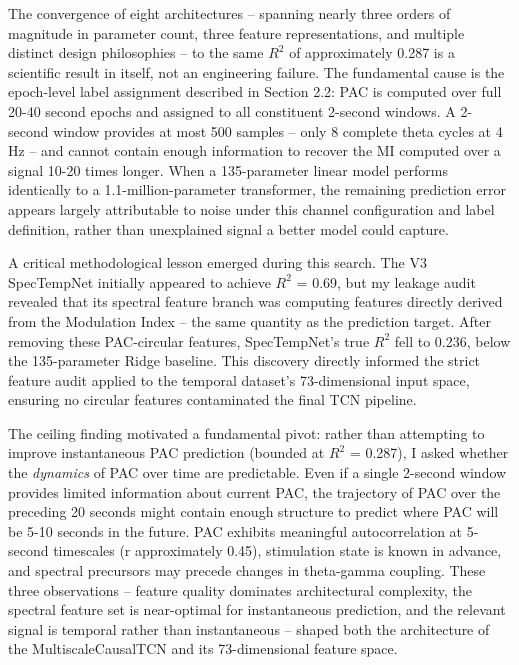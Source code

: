 \documentclass[11pt,letterpaper]{article}
\begin{document}
The convergence of eight architectures -- spanning nearly three orders of magnitude in parameter count, three feature representations, and multiple distinct design philosophies -- to the same $R^2$ of approximately 0.287 is a scientific result in itself, not an engineering failure. The fundamental cause is the epoch-level label assignment described in Section 2.2: PAC is computed over full 20-40 second epochs and assigned to all constituent 2-second windows. A 2-second window provides at most 500 samples -- only 8 complete theta cycles at 4 Hz -- and cannot contain enough information to recover the MI computed over a signal 10-20 times longer. When a 135-parameter linear model performs identically to a 1.1-million-parameter transformer, the remaining prediction error appears largely attributable to noise under this channel configuration and label definition, rather than unexplained signal a better model could capture.

A critical methodological lesson emerged during this search. The V3 SpecTempNet initially appeared to achieve $R^2$ = 0.69, but my leakage audit revealed that its spectral feature branch was computing features directly derived from the Modulation Index -- the same quantity as the prediction target. After removing these PAC-circular features, SpecTempNet's true $R^2$ fell to 0.236, below the 135-parameter Ridge baseline. This discovery directly informed the strict feature audit applied to the temporal dataset's 73-dimensional input space, ensuring no circular features contaminated the final TCN pipeline.

The ceiling finding motivated a fundamental pivot: rather than attempting to improve instantaneous PAC prediction (bounded at $R^2$ = 0.287), I asked whether the \textit{dynamics} of PAC over time are predictable. Even if a single 2-second window provides limited information about current PAC, the trajectory of PAC over the preceding 20 seconds might contain enough structure to predict where PAC will be 5-10 seconds in the future. PAC exhibits meaningful autocorrelation at 5-second timescales (r approximately 0.45), stimulation state is known in advance, and spectral precursors may precede changes in theta-gamma coupling. These three observations -- feature quality dominates architectural complexity, the spectral feature set is near-optimal for instantaneous prediction, and the relevant signal is temporal rather than instantaneous -- shaped both the architecture of the MultiscaleCausalTCN and its 73-dimensional feature space.
\end{document}
